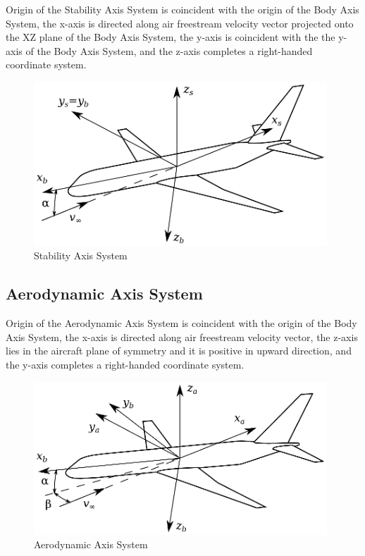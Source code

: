 Origin of the Stability Axis System is coincident with the origin of the Body Axis System, the x\nobreakdash-axis is directed along air freestream velocity vector projected onto the XZ plane of the Body Axis System, the y\nobreakdash-axis is coincident with the the y\nobreakdash-axis of the Body Axis System, and the z\nobreakdash-axis completes a right-handed coordinate system.

\begin{figure}
  \centering
  \includegraphics[width=110mm]{eps/coordinate_system_Stab.eps}
  \caption{Stability Axis System}
\end{figure}

\subsection{Aerodynamic Axis System}

Origin of the Aerodynamic Axis System is coincident with the origin of the Body Axis System, the x\nobreakdash-axis is directed along air freestream velocity vector, the z\nobreakdash-axis lies in the aircraft plane of symmetry and it is positive in upward direction, and the y\nobreakdash-axis completes a right-handed coordinate system.

\begin{figure}
  \centering
  \includegraphics[width=110mm]{eps/coordinate_system_Aero.eps}
  \caption{Aerodynamic Axis System}
\end{figure}

